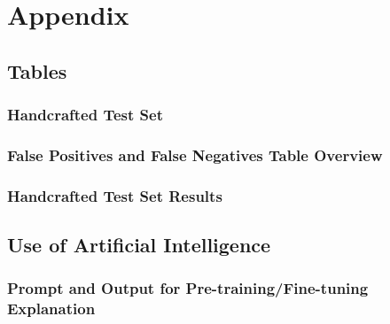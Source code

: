 \chapter*{Appendix}

\section{Tables}
\subsection{Handcrafted Test Set}
\label{tab:handcrafted_testset}


\subsection{False Positives and False Negatives Table Overview}
\label{tab:fp_fn_table}


\subsection{Handcrafted Test Set Results}
\label{tab:handcrafted_testset_results}


\section{Use of Artificial Intelligence}
\subsection{Prompt and Output for Pre-training/Fine-tuning Explanation}
\label{tab:prompt_pdf}


